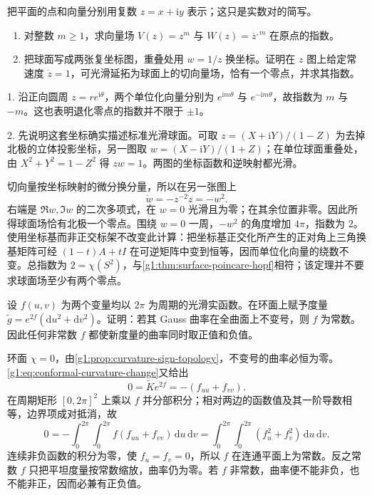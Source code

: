 \begin{exercise}\label{g1:ex:degenerate-vector-indices}
	把平面的点和向量分别用复数 \(z=x+\mathrm{i}y\) 表示；这只是实数对的简写。
	\begin{enumerate}
		\item 对整数 \(m\ge1\)，求向量场 \(V(z)=z^m\) 与 \(W(z)=\overline z^{,m}\) 在原点的指数。
		\item 把球面写成两张复坐标图，重叠处用 \(w=1/z\) 换坐标。证明在 \(z\) 图上给定常速度 \(\dot z=1\)，可光滑延拓为球面上的切向量场，恰有一个零点，并求其指数。
	\end{enumerate}
\end{exercise}
\begin{solution}
	1. 沿正向圆周 \(z=re^{\mathrm{i}\theta}\)，两个单位化向量分别为 \(e^{\mathrm{i}m\theta}\) 与 \(e^{-\mathrm{i}m\theta}\)，故指数为 \(m\) 与 \(-m\)。这也表明退化零点的指数并不限于 \(\pm1\)。

	2. 先说明这套坐标确实描述标准光滑球面。可取 \(z=(X+\mathrm{i}Y)/(1-Z)\) 为去掉北极的立体投影坐标，另一图取 \(w=(X-\mathrm{i}Y)/(1+Z)\)；在单位球面重叠处，由 \(X^2+Y^2=1-Z^2\) 得 \(zw=1\)。两图的坐标函数和逆映射都光滑。

	切向量按坐标映射的微分换分量，所以在另一张图上
	\[
		\dot w=-z^{-2}\dot z=-w^2.
	\]
	右端是 \(\Re w,\Im w\) 的二次多项式，在 \(w=0\) 光滑且为零；在其余位置非零。因此所得球面场恰有北极一个零点。围绕 \(w=0\) 一周，\(-w^2\) 的角度增加 \(4\pi\)，指数为 \(2\)。使用坐标基而非正交标架不改变此计算：把坐标基正交化所产生的正对角上三角换基矩阵可经 \((1-t)A+tI\) 在可逆矩阵中变到恒等，因而单位化向量的绕数不变。总指数为 \(2=\chi(S^2)\)，与\cref{g1:thm:surface-poincare-hopf}相符；该定理并不要求球面场至少有两个零点。
\end{solution}

\begin{exercise}\label{g1:ex:conformal-torus-sign}
	设 \(f(u,v)\) 为两个变量均以 \(2\pi\) 为周期的光滑实函数。在环面上赋予度量 \(\widetilde g=e^{2f}(\mathrm{d}u^2+\mathrm{d}v^2)\)。证明：若其 Gauss 曲率在全曲面上不变号，则 \(f\) 为常数。因此任何非常数 \(f\) 都使新度量的曲率同时取正值和负值。
\end{exercise}
\begin{solution}
	环面 \(\chi=0\)，由\cref{g1:prop:curvature-sign-topology}，不变号的曲率必恒为零。\eqref{g1:eq:conformal-curvature-change}又给出
	\[
		0=\widetilde K e^{2f}=-(f_{uu}+f_{vv}).
	\]
	在周期矩形 \([0,2\pi]^2\) 上乘以 \(f\) 并分部积分；相对两边的函数值及其一阶导数相等，边界项成对抵消，故
	\[
		0=-\int_0^{2\pi}\int_0^{2\pi}f(f_{uu}+f_{vv})\,\mathrm{d}u\,\mathrm{d}v
		=\int_0^{2\pi}\int_0^{2\pi}(f_u^2+f_v^2)\,\mathrm{d}u\,\mathrm{d}v.
	\]
	连续非负函数的积分为零，使 \(f_u=f_v=0\)，所以 \(f\) 在连通平面上为常数。反之常数 \(f\) 只把平坦度量按常数缩放，曲率仍为零。若 \(f\) 非常数，曲率便不能非负，也不能非正，因而必兼有正负值。
\end{solution}

